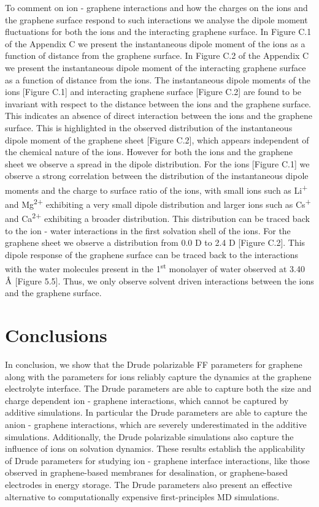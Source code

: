 To comment on ion - graphene interactions and how the charges on the ions and the graphene surface respond to such interactions we analyse the dipole moment fluctuations for both the ions and the interacting graphene surface. In Figure C.1 of the Appendix C we present the instantaneous dipole moment of the ions as a function of distance from the graphene surface. In Figure C.2 of the Appendix C we present the instantaneous dipole moment of the interacting graphene surface as a function of distance from the ions. The instantaneous dipole moments of the ions [Figure C.1] and interacting graphene surface [Figure C.2] are found to be invariant with respect to the distance between the ions and the graphene surface. This indicates an absence of direct interaction between the ions and the graphene surface. This is highlighted in the observed distribution of the instantaneous dipole moment of the graphene sheet [Figure C.2], which appears independent of the chemical nature of the ions. However for both the ions and the graphene sheet we observe a spread in the dipole distribution. For the ions [Figure C.1] we observe a strong correlation between the distribution of the instantaneous dipole moments and the charge to surface ratio of the ions, with small ions such as Li\textsuperscript{+} and Mg\textsuperscript{2+} exhibiting a very small dipole distribution and larger ions such as Cs\textsuperscript{+} and Ca\textsuperscript{2+} exhibiting a broader distribution. This distribution can be traced back to the ion - water interactions in the first solvation shell of the ions. For the graphene sheet we observe a distribution from 0.0 D to 2.4 D [Figure C.2]. This dipole response of the graphene surface can be traced back to the interactions with the water molecules present in the 1\textsuperscript{st} monolayer of water observed at 3.40 $\text{\normalfont\AA}$ [Figure 5.5]. Thus, we only observe solvent driven interactions between the ions and the graphene surface.
\section{Conclusions}
In conclusion, we show that the Drude polarizable FF parameters for graphene\supercite{h_polarization_2021} along with the parameters for ions\supercite{yu_simulating_2010} reliably capture the dynamics at the graphene electrolyte interface. The Drude parameters are able to capture both the size and charge dependent ion - graphene interactions, which cannot be captured by additive simulations. In particular the Drude parameters are able to capture the anion - graphene interactions, which are severely underestimated in the additive simulations. Additionally, the Drude polarizable simulations also capture the influence of ions on solvation dynamics. These results establish the applicability of Drude parameters for studying ion - graphene interface interactions, like those observed in graphene-based membranes for desalination,\supercite{sun_selective_2014,joshi_precise_2014,homaeigohar_graphene_2017,boretti_outlook_2018,yang_ultrathin_2017} or graphene-based electrodes in energy storage.\supercite{liang_graphene-based_2009,wang_supercapacitor_2009,wang_sngraphene_2009,stoller_graphene-based_2008} The Drude parameters also present an effective alternative to computationally expensive first-principles MD simulations.